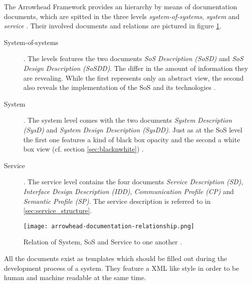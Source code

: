 The Arrowhead Framework provides an hierarchy by means of documentation documents, which are spitted in the three levels \emph{system-of-systems}, \emph{system} and \emph{service} \cite{arrowhead_inpr}. Their involved documents and relations are pictured in figure \ref{fig:sys-arrowhead}.

\begin{description}
\item [System-of-systems]. The levels features the two documents \emph{SoS Description (SoSD)} and \emph{SoS Design Description (SoSDD)}. The differ in the amount of information they are revealing. While the first represents only an abstract view, the second also reveals the implementation of the SoS and its technologies \cite{arrowhead_inpr}.
\item [System]. The system level comes with the two documents \emph{System Description (SysD)} and \emph{System Design Description (SysDD)}. Just as at the SoS level the first one features a kind of black box opacity and the second a white box view (cf. section \ref{sec:blacknwhite}) \cite{arrowhead_inpr}.
\item [Service]. The service level contains the four documents \emph{Service Description (SD)}, \emph{Interface Design Description (IDD)}, \emph{Communication Profile (CP)} and \emph{Semantic Profile (SP)}. The service description is referred to in \ref{sec:service_structure}.
\end{description}

\begin{figure}[ht]
\centering
\texttt{[image: arrowhead-documentation-relationship.png]}
\caption{Relation of System, SoS and Service to one another \cite{arrowhead:presentation}.}
\label{fig:sys-arrowhead}
\end{figure}

All the documents exist as templates which should be filled out during the development process of a system. They feature a XML like style in order to be human and machine readable at the same time.

